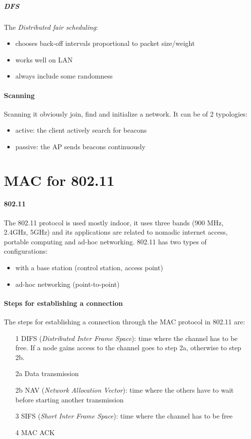 \subparagraph*{DFS} The \textit{Distributed fair scheduling}:
\begin{itemize}
\item chooses back-off intervals proportional to packet size/weight
\item works well on LAN
\item always include some randomness
\end{itemize}

\paragraph*{Scanning} Scanning it obviously join, find and initialize a network.
It can be of 2 typologies:
\begin{itemize}
\item active: the client actively search for beacons
\item passive: the AP sends beacons continuously
\end{itemize}

\section{MAC for 802.11}
\paragraph*{802.11} The 802.11 protocol is used mostly indoor, it uses three
bands (900 MHz, 2.4GHz, 5GHz) and its applications are related to nomadic
internet access, portable computing and ad-hoc networking.
802.11 has two types of configurations:
\begin{itemize}
\item with a base station (control station, access point)
\item ad-hoc networking (point-to-point)
\end{itemize}

\paragraph*{Steps for establishing a connection}
The steps for establishing a connection through the MAC protocol in 802.11 are:
\begin{enumerate}
\item[1] DIFS (\textit{Distributed Inter Frame Space}): time where the channel
  has to be free. If a node gains access to the channel goes to step 2a,
  otherwise to step 2b.
\item[2a] Data transmission
\item[2b] NAV (\textit{Network Allocation Vector}): time where the others have
  to wait before starting another transmission
\item[3] SIFS (\textit{Short Inter Frame Space}): time where the channel has to
  be free
\item[4] MAC ACK
\end{enumerate}

